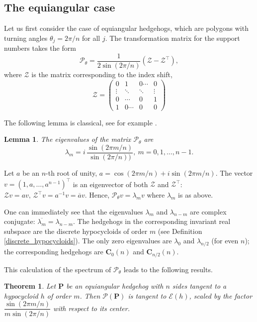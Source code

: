 \documentclass[12pt]{article}
\makeatletter
\newtheorem{lemma}{Lemma}[section]
\newtheorem{theorem}{Theorem}
\renewenvironment{proof}[1][\proofname] 
{\par\pushQED{\qed}\normalfont\topsep6\p@\@plus6\p@\relax\trivlist\item[\hskip\labelsep\bfseries#1\@addpunct{.}]\ignorespaces}{\popQED\endtrivlist\@endpefalse}
\newcommand{\Pev}{\mathcal{P}}
\newcommand{\E}{\mathcal{E}}
\renewcommand{\P}{\mathbf{P}}
\makeatother
\begin{document}
\subsection{The equiangular case} \label{PevEquiang}
Let us first consider the case of equiangular hedgehogs, which are polygons with turning angles $\theta_j = 2\pi/n$ for all $j$. The transformation matrix for the support numbers takes the form
\[ \Pev_\theta = \frac1{2\sin(2\pi/n)}(\mathcal{Z} - \mathcal{Z}^\top), \]
where $\mathcal{Z}$ is the matrix corresponding to the index shift, 
\begin{equation}
\label{eqnZ}
\mathcal{Z}=\begin{pmatrix}
0 & 1  & 0\cdots & 0\\ \vdots&\ddots&\ddots&\vdots \\ 0&\cdots&0&1\\ 1& 0\cdots& 0&0
\end{pmatrix}
\end{equation}

The following lemma is classical, see for example \cite{Da}.
\begin{lemma}
\label{spectrum}
The eigenvalues of the matrix $\Pev_\theta$ are $$\lambda_m=i\, \frac{\sin(2\pi m/n)}{\sin(2\pi/n))},\ m=0,1,\dots,n-1.$$
\end{lemma}

\begin{proof}
Let $a$ be an $n$-th root of unity, $a=\cos(2\pi m/n)+i\sin(2\pi m/n)$. The vector $v=(1,a,\dots,a^{n-1})^\top$ is an eigenvector of both $\mathcal Z$ and $\mathcal Z^\top$: $\mathcal Zv=av,\, \mathcal Z^\top v=a^{-1}v=\overline av$. Hence, $\Pev_\theta v=\lambda_mv$ where $\lambda_m$ is as above.
\end{proof}



One can immediately see that the eigenvalues $\lambda_m$ and $\lambda_{n-m}$ are complex conjugate: $\overline{\lambda_m} = \lambda_{n-m}$. The hedgehogs in the corresponding invariant real subspace are the discrete hypocycloids of order $m$ (see Definition \ref{discrete_hypocycloids}). The only zero eigenvalues are $\lambda_0$ and  $\lambda_{n/2}$ (for even $n$); the corresponding hedgehogs are $\mathbf{C}_0(n)$ and $\mathbf{C}_{n/2}(n)$.

This calculation of the spectrum of $\Pev_\theta$ leads to the following results.

\begin{theorem}
\label{EvolDHPerp}
Let $\P$ be an equiangular hedgehog with $n$ sides tangent to a hypocycloid $h$ of order $m$. Then $\Pev(\P)$ is tangent to $\E(h)$,  scaled by the factor $\dfrac{\sin(2\pi m/n)}{m\sin(2\pi/n)}$ with respect to its center. 
\end{theorem}
\end{document}
